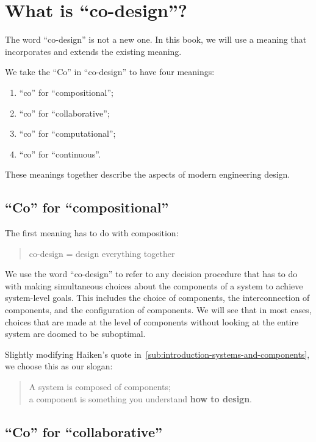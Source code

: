 

\section{What is ``co-design''?}
\label{sec:design-what-is-co-design}

The word ``co-design'' is not a new one. In this book, we will use
a meaning that incorporates and extends the existing meaning.

We take the ``Co'' in ``co-design'' to have four meanings:
\begin{enumerate}
    \item ``co'' for ``compositional'';
    \item ``co'' for ``collaborative'';
    \item ``co'' for ``computational'';
    \item ``co'' for ``continuous''.
\end{enumerate}
These meanings together describe the aspects of modern engineering design.

\subsection{``Co'' for ``compositional''}

The first meaning has to do with composition:

\begin{quote}
    co-design = design everything together
\end{quote}

We use the word ``co-design'' to refer to any decision procedure that has to do with making simultaneous choices about the components of a system to achieve system-level goals.
This includes the choice of components, the interconnection of components, and the configuration of components.
We will see that in most cases, choices that are made at the level of components without looking at the entire system are doomed to be suboptimal.


Slightly modifying Haiken's quote in~\cref{sub:introduction-systems-and-components}, we choose this as our slogan:

\begin{quote}
    A system is composed of components;\\
    a component is something you understand
    \textbf{how to design}.
\end{quote}

\subsection{``Co'' for ``collaborative''}

